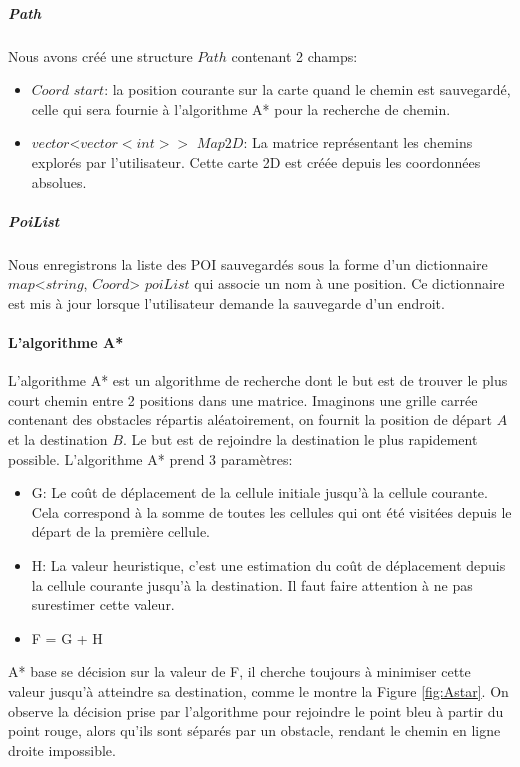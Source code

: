 \documentclass[11pt]{article}
\begin{document}
          \subparagraph{Path}        
            Nous avons créé une structure $Path$ contenant 2 champs: 
            \begin{itemize}
              \item $Coord$ $start$: la position courante sur la carte quand le chemin est sauvegardé, celle qui sera fournie à l'algorithme
              A* pour la recherche de chemin.
              \item $vector$<$vector<int>>$ $Map2D$: La matrice représentant les chemins explorés par l'utilisateur. Cette carte 2D est créée 
              depuis les coordonnées absolues.     
            \end{itemize} 

          \subparagraph{PoiList}   
            Nous enregistrons la liste des POI sauvegardés sous la forme d'un dictionnaire $map$<$string$, $Coord$> $poiList$ qui associe
            un nom à une position. Ce dictionnaire est mis à jour lorsque l'utilisateur demande la sauvegarde d'un endroit.            

        \paragraph{L'algorithme A*}
          L'algorithme A* est un algorithme de recherche dont le but est de trouver le plus court chemin entre 2 positions dans une matrice.
          Imaginons une grille carrée contenant des obstacles répartis aléatoirement, on fournit la position de départ $A$ et la destination $B$.
          Le but est de rejoindre la destination le plus rapidement possible.
          L'algorithme A* prend 3 paramètres:

          \begin{itemize}
            \item G: Le coût de déplacement de la cellule initiale jusqu'à la cellule courante. Cela correspond à la somme de toutes les 
            cellules qui ont été visitées depuis le départ de la première cellule.
            \item H: La valeur heuristique, c'est une estimation du coût de déplacement depuis la cellule courante jusqu'à la destination. 
            Il faut faire attention à ne pas surestimer cette valeur.
            \item F = G + H            
          \end{itemize} 
          A* base se décision sur la valeur de F, il cherche toujours à minimiser cette valeur jusqu'à atteindre sa destination,
          comme le montre la Figure \ref{fig:Astar}. On observe la décision prise par l'algorithme pour rejoindre le point bleu à partir 
          du point rouge, alors qu'ils sont séparés par un obstacle, rendant le chemin en ligne droite impossible.    
          
\end{document}

